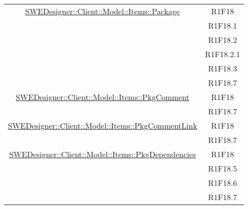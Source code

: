 \documentclass[../DefinizioneDiProdotto.tex]{subfiles}
\begin{document}
\begin{longtable}{|c|c|}
				\hyperlink{SWEDesigner::Client::Model::Items::Package}{SWEDesigner::Client::Model::Items::Package}
				& R1F18\\
				& R1F18.1\\
				& R1F18.2\\
				& R1F18.2.1\\
				& R1F18.3\\
				& R1F18.7\\
				\hline

				\hyperlink{SWEDesigner::Client::Model::Items::PkgComment}{SWEDesigner::Client::Model::Items::PkgComment}
				& R1F18\\
				& R1F18.7\\
				\hline

				\hyperlink{SWEDesigner::Client::Model::Items::PkgCommentLink}{SWEDesigner::Client::Model::Items::PkgCommentLink}
				& R1F18\\
				& R1F18.7\\
				\hline

				\hyperlink{SWEDesigner::Client::Model::Items::PkgDependencies}{SWEDesigner::Client::Model::Items::PkgDependencies}
				& R1F18\\
				& R1F18.5\\
				& R1F18.6\\
				& R1F18.7\\
				\hline


\end{longtable}
\end{document}
